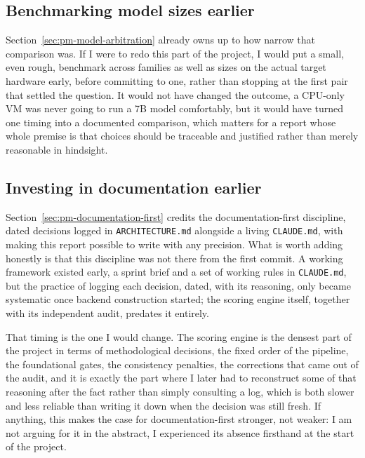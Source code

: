 \subsection{Benchmarking model sizes earlier}
\label{sec:pm-benchmark-earlier}

Section~\ref{sec:pm-model-arbitration} already owns up to how narrow that comparison was. If I were to redo this part of the project, I would put a small, even rough, benchmark across families as well as sizes on the actual target hardware early, before committing to one, rather than stopping at the first pair that settled the question. It would not have changed the outcome, a CPU-only VM was never going to run a 7B model comfortably, but it would have turned one timing into a documented comparison, which matters for a report whose whole premise is that choices should be traceable and justified rather than merely reasonable in hindsight.

\subsection{Investing in documentation earlier}
\label{sec:pm-documentation-earlier}

Section~\ref{sec:pm-documentation-first} credits the documentation-first discipline, dated decisions logged in \texttt{ARCHITECTURE.md} alongside a living \texttt{CLAUDE.md}, with making this report possible to write with any precision. What is worth adding honestly is that this discipline was not there from the first commit. A working framework existed early, a sprint brief and a set of working rules in \texttt{CLAUDE.md}, but the practice of logging each decision, dated, with its reasoning, only became systematic once backend construction started; the scoring engine itself, together with its independent audit, predates it entirely.

That timing is the one I would change. The scoring engine is the densest part of the project in terms of methodological decisions, the fixed order of the pipeline, the foundational gates, the consistency penalties, the corrections that came out of the audit, and it is exactly the part where I later had to reconstruct some of that reasoning after the fact rather than simply consulting a log, which is both slower and less reliable than writing it down when the decision was still fresh. If anything, this makes the case for documentation-first stronger, not weaker: I am not arguing for it in the abstract, I experienced its absence firsthand at the start of the project.

